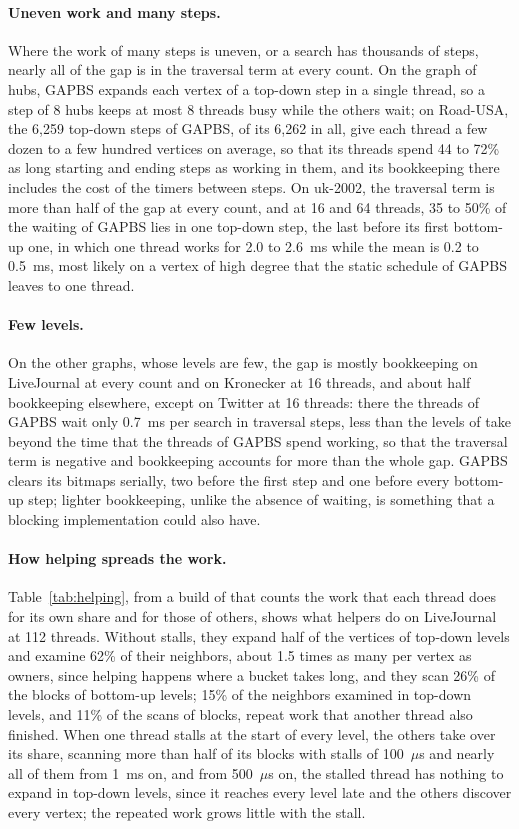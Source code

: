 \paragraph{Uneven work and many steps.} Where the work of many steps is uneven, or a search has thousands of steps, nearly all of the gap is in the traversal term at every count. On the graph of hubs, GAPBS expands each vertex of a top-down step in a single thread, so a step of 8 hubs keeps at most 8 threads busy while the others wait; on Road-USA, the 6,259 top-down steps of GAPBS, of its 6,262 in all, give each thread a few dozen to a few hundred vertices on average, so that its threads spend 44 to 72\% as long starting and ending steps as working in them, and its bookkeeping there includes the cost of the timers between steps. On uk-2002, the traversal term is more than half of the gap at every count, and at 16 and 64 threads, 35 to 50\% of the waiting of GAPBS lies in one top-down step, the last before its first bottom-up one, in which one thread works for 2.0 to 2.6~ms while the mean is 0.2 to 0.5~ms, most likely on a vertex of high degree that the static schedule of GAPBS leaves to one thread.

\paragraph{Few levels.} On the other graphs, whose levels are few, the gap is mostly bookkeeping on LiveJournal at every count and on Kronecker at 16 threads, and about half bookkeeping elsewhere, except on Twitter at 16 threads: there the threads of GAPBS wait only 0.7~ms per search in traversal steps, less than the levels of \wfdo take beyond the time that the threads of GAPBS spend working, so that the traversal term is negative and bookkeeping accounts for more than the whole gap. GAPBS clears its bitmaps serially, two before the first step and one before every bottom-up step; lighter bookkeeping, unlike the absence of waiting, is something that a blocking implementation could also have.

\paragraph{How helping spreads the work.} Table~\ref{tab:helping}, from a build of \wfdo that counts the work that each thread does for its own share and for those of others, shows what helpers do on LiveJournal at 112 threads. Without stalls, they expand half of the vertices of top-down levels and examine 62\% of their neighbors, about 1.5 times as many per vertex as owners, since helping happens where a bucket takes long, and they scan 26\% of the blocks of bottom-up levels; 15\% of the neighbors examined in top-down levels, and 11\% of the scans of blocks, repeat work that another thread also finished. When one thread stalls at the start of every level, the others take over its share, scanning more than half of its blocks with stalls of 100~$\mu$s and nearly all of them from 1~ms on, and from 500~$\mu$s on, the stalled thread has nothing to expand in top-down levels, since it reaches every level late and the others discover every vertex; the repeated work grows little with the stall.
